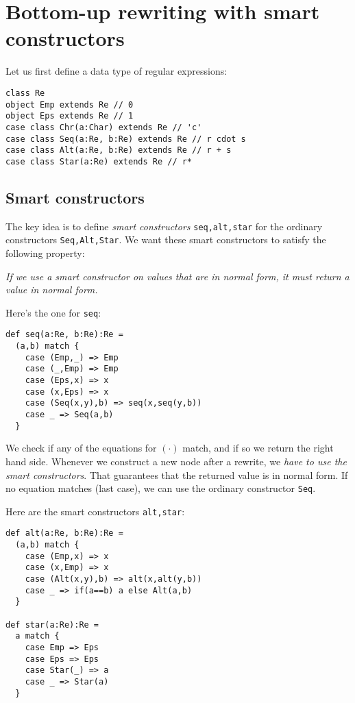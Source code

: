 \documentclass[a4paper, 11pt]{article}
\theoremstyle{definition}
\begin{document}
\section{Bottom-up rewriting with smart constructors}

Let us first define a data type of regular expressions:

\begin{lstlisting}
class Re
object Emp extends Re // 0
object Eps extends Re // 1
case class Chr(a:Char) extends Re // 'c'
case class Seq(a:Re, b:Re) extends Re // r cdot s
case class Alt(a:Re, b:Re) extends Re // r + s
case class Star(a:Re) extends Re // r*
\end{lstlisting}

\subsection{Smart constructors}

The key idea is to define \emph{smart constructors} \lstinline|seq,alt,star| for the ordinary constructors \lstinline|Seq,Alt,Star|. We want these smart constructors to satisfy the following property:

\emph{If we use a smart constructor on values that are in normal form, it must return a value in normal form.}

Here's the one for \lstinline|seq|:

\begin{lstlisting}
def seq(a:Re, b:Re):Re =
  (a,b) match {
    case (Emp,_) => Emp
    case (_,Emp) => Emp
    case (Eps,x) => x
    case (x,Eps) => x
    case (Seq(x,y),b) => seq(x,seq(y,b))
    case _ => Seq(a,b)
  }
\end{lstlisting}

We check if any of the equations for $(\cdot)$ match, and if so we return the right hand side. Whenever we construct a new node after a rewrite, we \emph{have to use the smart constructors}. That guarantees that the returned value is in normal form. If no equation matches (last case), we can use the ordinary constructor \lstinline|Seq|.

Here are the smart constructors \lstinline|alt,star|:

\begin{lstlisting}
def alt(a:Re, b:Re):Re =
  (a,b) match {
    case (Emp,x) => x
    case (x,Emp) => x
    case (Alt(x,y),b) => alt(x,alt(y,b))
    case _ => if(a==b) a else Alt(a,b)
  }

def star(a:Re):Re =
  a match {
    case Emp => Eps
    case Eps => Eps
    case Star(_) => a
    case _ => Star(a)
  }
\end{lstlisting}
\end{document}
